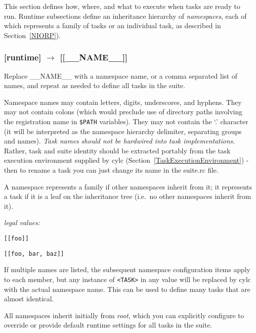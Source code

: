 This section defines how, where, and what to execute when tasks are
ready to run. Runtime subsections define an inheritance hierarchy of 
{\em namespaces}, each of which represents a family of tasks or an
individual task, as described in Section~\ref{NIORP}).

\subsubsection[{[[}\_\_NAME\_\_{]]}]{[runtime] $\rightarrow$ [[\_\_NAME\_\_]]}

Replace \_\_NAME\_\_ with a namespace name, or a comma separated list of
names, and repeat as needed to define all tasks in the suite.

Namespace names may contain letters, digits, underscores, and hyphens.
They may not contain colons (which would preclude use of directory paths
involving the registration name in \lstinline=$PATH= variables). They 
may not contain the `.' character (it will be interpreted 
as the namespace hierarchy delimiter, separating groups and names). 
{\em Task names should not be hardwired into task implementations.}
Rather, task and suite identity should be extracted portably from the
task execution environment supplied by cylc 
(Section~\ref{TaskExecutionEnvironment}) - then to rename a task you
can just change its name in the suite.rc file.

A namespace represents a family if other namespaces inherit from it; it
represents a task if it is a leaf on the inheritance tree (i.e.\ no
other namespaces inherit from it).

\begin{myitemize}
\item {\em legal values:} 
    \begin{myitemize}
        \item \lstinline=[[foo]]=
        \item \lstinline=[[foo, bar, baz]]=
    \end{myitemize}
\end{myitemize}

If multiple names are listed, the subsequent namespace configuration
items apply to each member, but any instance of \lstinline=<TASK>= 
in any value will be replaced by cylc with the actual namespace name.
This can be used to define many tasks that are almost identical.

All namespaces inherit initially from {\em root}, which you can
explicitly configure to override or provide default runtime settings for
all tasks in the suite.

